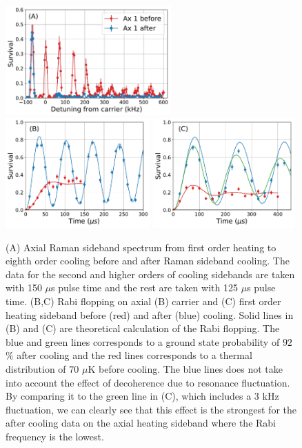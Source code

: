 \documentclass[aps,prl,twocolumn,groupedaddress]{revtex4-1}
\begin{document}
\begin{figure}
  \includegraphics[height=4.2cm]{imgs/spectrum_a1.pdf}
  \includegraphics[height=4.2cm]{imgs/rabi_flop_a1_0.pdf}
  \includegraphics[height=4.2cm]{imgs/rabi_flop_a1_p1.pdf}
  \caption{(A) Axial Raman sideband spectrum from first order heating to eighth order cooling
    before and after Raman sideband cooling.
    The data for the second and higher orders of cooling sidebands are taken with 150 $\mu$s
    pulse time and the rest are taken with 125 $\mu$s pulse time.
    (B,C) Rabi flopping on axial (B) carrier and (C) first order heating sideband
    before (red) and after (blue) cooling.
    Solid lines in (B) and (C) are theoretical calculation of the Rabi flopping.
    The blue and green lines corresponds to a ground state probability of $92$\% after cooling and
    the red lines corresponds to a thermal distribution of $70$ $\mu$K before cooling.
    The blue lines does not take into account the effect of decoherence due to resonance
    fluctuation. By comparing it to the green line in (C), which includes a $3$ kHz fluctuation,
    we can clearly see that this effect is the strongest for the after cooling data on
    the axial heating sideband where the Rabi frequency is the lowest.
    \label{f-axial}}
\end{figure}
\end{document}
